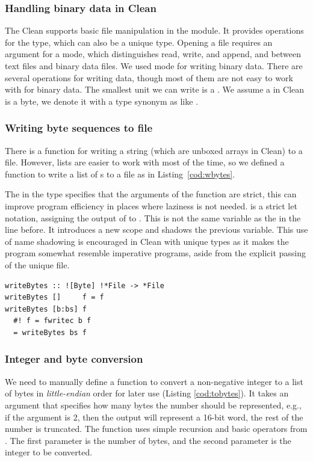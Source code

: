 \documentclass[runningheads]{llncs}
\begin{document}
\subsubsection{Handling binary data in Clean}
The Clean  supports basic file manipulation in the
 module. It provides operations for the  type,
which can also be a unique type.
Opening a file requires an argument for a mode, which distinguishes read, write, and append, and between text files and binary data files. We used  mode for writing binary data.
There are several operations for writing data, though most of them are
not easy to work with for binary data. The smallest unit we can write is
a . We assume a  in Clean is a byte, we denote it with a type synonym as like . %

\subsubsection{Writing byte sequences to file}
There is a function for writing a string (which are unboxed 
arrays in Clean) to a file. However, lists are easier to work with most
of the time, so we defined a function to write a list of s
to a file as in Listing~\ref{cod:wbytes}.

The \Cl{!} in the type specifies that the arguments of the function are
strict, this can improve program efficiency in places where laziness is
not needed. \Cl{\#!} is a strict let notation, assigning the output
of  to . This  is not the same variable as
the  in the line before. It introduces a new scope and
shadows the previous variable. This use of name shadowing is encouraged in Clean with unique types as it makes the program somewhat resemble imperative programs, aside from the explicit passing of the unique file.
\begin{lstlisting}[language=Clean,label={cod:wbytes},captionpos=b,caption={Writing a list of bytes into a file}]
writeBytes :: ![Byte] !*File -> *File
writeBytes []     f = f
writeBytes [b:bs] f
  #! f = fwritec b f
  = writeBytes bs f
\end{lstlisting}


\subsubsection{Integer and byte conversion}
We need to manually define a function to convert a non-negative integer
to a list of bytes in \emph{little-endian}\label{gloss:lilEnd} order for later
use (Listing \ref{cod:tobytes}). It takes an argument that specifies
how many bytes the number should be represented, e.g., if the argument is 2, then the output will represent a 16-bit word, the rest of the number
is truncated. The function uses simple recursion and basic operators
from . The first parameter is the number of bytes, and the second parameter is the integer to be converted.
\end{document}
